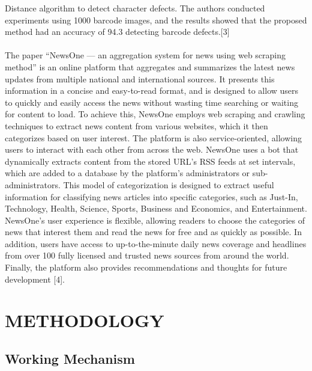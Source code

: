Distance algorithm to detect character defects. The authors conducted experiments 
using 1000 barcode images, and the results showed that the proposed method had an 
accuracy of 94.3%
detecting barcode defects.[3]
\\
\\
The paper “NewsOne — an aggregation system for news using web scraping method” 
is an online platform that aggregates and summarizes the latest news updates from 
multiple national and international sources. It presents this information in a concise and 
easy-to-read format, and is designed to allow users to quickly and easily access the 
news without wasting time searching or waiting for content to load. To achieve this, 
NewsOne employs web scraping and crawling techniques to extract news content from 
various websites, which it then categorizes based on user interest. The platform is also 
service-oriented, allowing users to interact with each other from across the web. 
NewsOne uses a bot that dynamically extracts content from the stored URL's RSS feeds 
at set intervals, which are added to a database by the platform's administrators or sub-administrators. This model of categorization is designed to extract useful information 
for classifying news articles into specific categories, such as Just-In, Technology, 
Health, Science, Sports, Business and Economics, and Entertainment. NewsOne's user 
experience is flexible, allowing readers to choose the categories of news that interest 
them and read the news for free and as quickly as possible. In addition, users have 
access to up-to-the-minute daily news coverage and headlines from over 100 fully 
licensed and trusted news sources from around the world. Finally, the platform also 
provides recommendations and thoughts for future development [4].





\chapter{METHODOLOGY}

\section{Working Mechanism}

